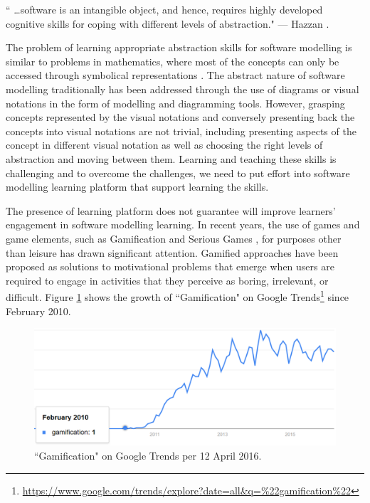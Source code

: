 \documentclass[12pt, a4paper]{report} \usepackage[titletoc]{appendix}
\begin{document}
\begin{displayquote}
`` \dots software is an intangible object, and hence, requires highly developed
cognitive skills for coping with different levels of abstraction." --- Hazzan
\cite{hazzan2008reflections}.
\end{displayquote}

The problem of learning appropriate abstraction skills for software modelling is similar to problems in mathematics, where most of the concepts can only be accessed through symbolical representations \cite{Duval2006}. The abstract nature of software modelling traditionally has been addressed through the use of diagrams or visual notations in the form of modelling and diagramming tools. However, grasping concepts represented by the visual notations and conversely presenting back the concepts into visual notations are not trivial, including presenting aspects of the concept in different visual notation as well as choosing the right levels of abstraction and moving between them. Learning and teaching these skills is challenging and to overcome the challenges, we need to put effort into software modelling learning platform that support learning the skills. 
 
The presence of learning platform does not guarantee will improve learners' engagement in software modelling learning. In recent years, the use of games and game elements, such as Gamification \cite{deterding2011game} and Serious Games \cite{Michael2005}, for purposes other than leisure has drawn significant attention. Gamified approaches have been proposed as solutions to motivational problems that emerge when users are required to engage in activities that they perceive as boring, irrelevant, or difficult. Figure \ref{gamification-trend} shows the growth of ``Gamification" on Google Trends\footnote{\url{https://www.google.com/trends/explore?date=all&q=\%22gamification\%22}}
since February 2010.

\begin{figure}[ht] \centering \includegraphics[width=12cm]{gamification-trend}
\caption{``Gamification" on Google Trends per 12 April 2016.}
\label{gamification-trend}
\end{figure}
\end{document}
